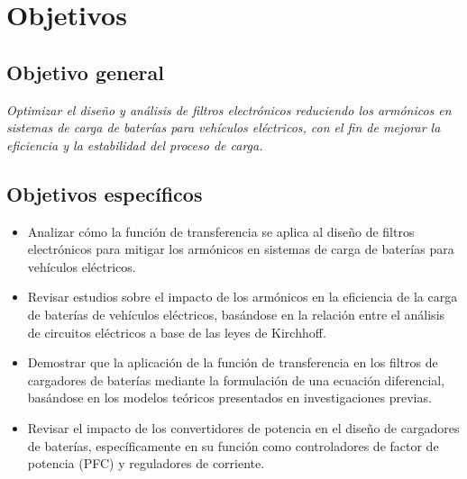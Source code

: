 \section{Objetivos}
\label{sec:objetivos}

\subsection*{Objetivo general}
\textit{Optimizar el dise\~no y an\'alisis de filtros electr\'onicos reduciendo los arm\'onicos en sistemas de carga de bater\'ias para veh\'iculos el\'ectricos, con el fin de mejorar la eficiencia y la estabilidad del proceso de carga.}

\subsection*{Objetivos espec\'ificos}
\begin{itemize}
  \item Analizar c\'omo la funci\'on de transferencia se aplica al dise\~no de filtros electr\'onicos para mitigar los arm\'onicos en sistemas de carga de bater\'ias para veh\'iculos el\'ectricos.
  \item Revisar estudios sobre el impacto de los arm\'onicos en la eficiencia de la carga de bater\'ias de veh\'iculos el\'ectricos, bas\'andose en la relaci\'on entre el an\'alisis de circuitos el\'ectricos a base de las leyes de Kirchhoff.
  \item Demostrar que la aplicaci\'on de la funci\'on de transferencia en los filtros de cargadores de bater\'ias mediante la formulaci\'on de una ecuaci\'on diferencial, bas\'andose en los modelos te\'oricos presentados en investigaciones previas.
  \item Revisar el impacto de los convertidores de potencia en el dise\~no de cargadores de bater\'ias, espec\'ificamente en su funci\'on como controladores de factor de potencia (PFC) y reguladores de corriente.
\end{itemize}
\newpage
